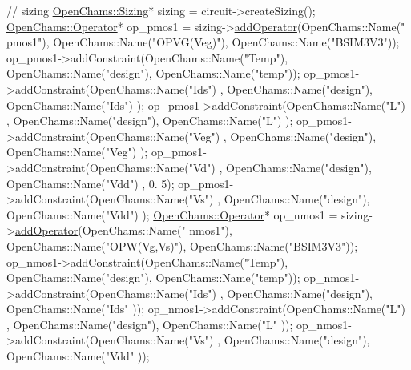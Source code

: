 \begin{DoxyCodeInclude}
    \textcolor{comment}{// sizing}
    \mbox{\hyperlink{class_open_chams_1_1_sizing}{OpenChams::Sizing}}* sizing = circuit->createSizing();
    \mbox{\hyperlink{class_open_chams_1_1_operator}{OpenChams::Operator}}* op\_pmos1 = sizing->\mbox{\hyperlink{class_open_chams_1_1_sizing_a712e045c11e463cff8411b3d0fd7f732}{addOperator}}(OpenChams::Name(\textcolor{stringliteral}{"
      pmos1"}), OpenChams::Name(\textcolor{stringliteral}{"OPVG(Veg)"}), OpenChams::Name(\textcolor{stringliteral}{"BSIM3V3"}));
    op\_pmos1->addConstraint(OpenChams::Name(\textcolor{stringliteral}{"Temp"}), OpenChams::Name(\textcolor{stringliteral}{"design"}), OpenChams::Name(\textcolor{stringliteral}{"temp"}));
    op\_pmos1->addConstraint(OpenChams::Name(\textcolor{stringliteral}{"Ids"}) , OpenChams::Name(\textcolor{stringliteral}{"design"}), OpenChams::Name(\textcolor{stringliteral}{"Ids"}) );
    op\_pmos1->addConstraint(OpenChams::Name(\textcolor{stringliteral}{"L"})   , OpenChams::Name(\textcolor{stringliteral}{"design"}), OpenChams::Name(\textcolor{stringliteral}{"L"})   );
    op\_pmos1->addConstraint(OpenChams::Name(\textcolor{stringliteral}{"Veg"}) , OpenChams::Name(\textcolor{stringliteral}{"design"}), OpenChams::Name(\textcolor{stringliteral}{"Veg"}) );
    op\_pmos1->addConstraint(OpenChams::Name(\textcolor{stringliteral}{"Vd"})  , OpenChams::Name(\textcolor{stringliteral}{"design"}), OpenChams::Name(\textcolor{stringliteral}{"Vdd"}) , 0.
      5);
    op\_pmos1->addConstraint(OpenChams::Name(\textcolor{stringliteral}{"Vs"})  , OpenChams::Name(\textcolor{stringliteral}{"design"}), OpenChams::Name(\textcolor{stringliteral}{"Vdd"}) );
    \mbox{\hyperlink{class_open_chams_1_1_operator}{OpenChams::Operator}}* op\_nmos1 = sizing->\mbox{\hyperlink{class_open_chams_1_1_sizing_a712e045c11e463cff8411b3d0fd7f732}{addOperator}}(OpenChams::Name(\textcolor{stringliteral}{"
      nmos1"}), OpenChams::Name(\textcolor{stringliteral}{"OPW(Vg,Vs)"}), OpenChams::Name(\textcolor{stringliteral}{"BSIM3V3"}));
    op\_nmos1->addConstraint(OpenChams::Name(\textcolor{stringliteral}{"Temp"}), OpenChams::Name(\textcolor{stringliteral}{"design"}), OpenChams::Name(\textcolor{stringliteral}{"temp"}));
    op\_nmos1->addConstraint(OpenChams::Name(\textcolor{stringliteral}{"Ids"}) , OpenChams::Name(\textcolor{stringliteral}{"design"}), OpenChams::Name(\textcolor{stringliteral}{"Ids"} ));
    op\_nmos1->addConstraint(OpenChams::Name(\textcolor{stringliteral}{"L"})   , OpenChams::Name(\textcolor{stringliteral}{"design"}), OpenChams::Name(\textcolor{stringliteral}{"L"}   ));
    op\_nmos1->addConstraint(OpenChams::Name(\textcolor{stringliteral}{"Vs"})  , OpenChams::Name(\textcolor{stringliteral}{"design"}), OpenChams::Name(\textcolor{stringliteral}{"Vdd"} ));

\end{DoxyCodeInclude}
